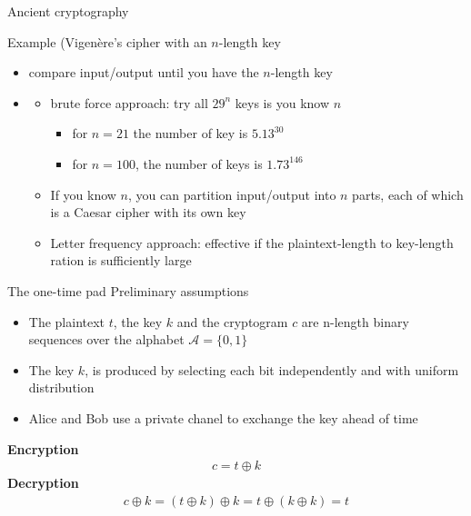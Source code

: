 \begin{parag}{Ancient cryptography}
\begin{subparag}{Example (Vigenère's cipher with an $n$-length key}
\begin{itemize}
        \item {} compare input/output until you have the $n$-length key
        \item {}
            \begin{itemize}
                \item brute force approach: try all $29^n$ keys is you know $n$
                    \begin{itemize}
                        \item for $n = 21$ the number of key is $5.13^{30}$
                        \item for $n = 100$, the number of keys is $1.73^{146}$
                    \end{itemize}
                \item If you know $n$, you can partition input/output into $n$ parts, each of which is a Caesar cipher with its own key
                \item Letter frequency approach: effective if the plaintext-length to key-length ration is sufficiently large
            \end{itemize}
    \end{itemize}
\end{subparag}
\end{parag}

\begin{parag}{The one-time pad}
    Preliminary assumptions
    \begin{itemize}
        \item The plaintext $t$, the key $k$ and the cryptogram $c$ are n-length binary sequences over the alphabet $ \mathcal{A} = \{0, 1\}$
        \item The key $k$, is produced by selecting each bit independently and with uniform distribution
        \item Alice and Bob use a private chanel to exchange the key ahead of time
    \end{itemize}
    \textbf{Encryption}
    \begin{align*}
        c = t \oplus k
    \end{align*}
    \textbf{Decryption}
    \begin{align*}
        c \oplus k = (t \oplus k) \oplus k = t \oplus ( k \oplus k) = t
    \end{align*}
    
    

\end{parag}



